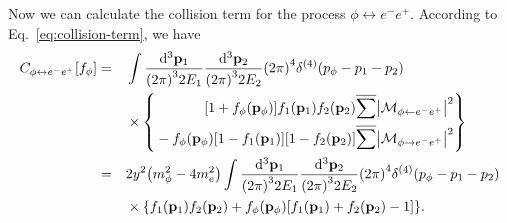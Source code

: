\documentclass{article}
\begin{document}
        Now we can calculate the collision term for the process $\phi \leftrightarrow e^- e^+$.
        According to Eq.~\eqref{eq:collision-term}, we have
        \begin{equation}
            \begin{aligned}
                C_{\phi \leftrightarrow e^- e^+}[f_\phi] & = && \int \frac{\dd[3]{\vb{p}_1}}{\qty(2 \pi)^3 2 E_1} \frac{\dd[3]{\vb{p}_2}}{\qty(2 \pi)^3 2 E_2} \qty(2 \pi)^4 \delta^{(4)}\qty(p_\phi - p_1 - p_2) \\
                & && {} \times \qty{ \begin{aligned}
                    \qty[1 + f_\phi(\vb{p}_\phi)] f_1(\vb{p}_1) f_2(\vb{p}_2) \overline{\sum} \abs{\mathcal{M}_{\phi \leftarrow e^- e^+}}^2 \\
                    {} - f_\phi(\vb{p}_\phi) \qty[1 - f_1(\vb{p}_1)] \qty[1 - f_2(\vb{p}_2)] \overline{\sum} \abs{\mathcal{M}_{\phi \to e^- e^+}}^2
                \end{aligned} } \\
                & = && 2 y^2 \qty(m_\phi^2 - 4 m_e^2) \int \frac{\dd[3]{\vb{p}_1}}{\qty(2 \pi)^3 2 E_1} \frac{\dd[3]{\vb{p}_2}}{\qty(2 \pi)^3 2 E_2} \qty(2 \pi)^4 \delta^{(4)}\qty(p_\phi - p_1 - p_2) \\
                & && {} \times \qty{f_1(\vb{p}_1) f_2(\vb{p}_2) + f_\phi(\vb{\vb{p}_\phi}) \qty[f_1(\vb{p}_1) + f_2(\vb{p}_2) - 1]}.
            \end{aligned}
        \end{equation}
\end{document}
